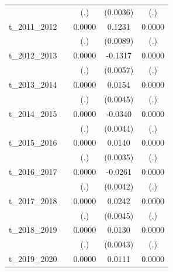 \begin{table}[htbp]
\begin{tabular}{l*{4}{c}}
            &                     &         (.)         &    (0.0036)         &         (.)         \\
[1em]
t\_2011\_2012 &                     &      0.0000         &      0.1231\sym{***}&      0.0000         \\
            &                     &         (.)         &    (0.0089)         &         (.)         \\
[1em]
t\_2012\_2013 &                     &      0.0000         &     -0.1317\sym{***}&      0.0000         \\
            &                     &         (.)         &    (0.0057)         &         (.)         \\
[1em]
t\_2013\_2014 &                     &      0.0000         &      0.0154\sym{***}&      0.0000         \\
            &                     &         (.)         &    (0.0045)         &         (.)         \\
[1em]
t\_2014\_2015 &                     &      0.0000         &     -0.0340\sym{***}&      0.0000         \\
            &                     &         (.)         &    (0.0044)         &         (.)         \\
[1em]
t\_2015\_2016 &                     &      0.0000         &      0.0140\sym{***}&      0.0000         \\
            &                     &         (.)         &    (0.0035)         &         (.)         \\
[1em]
t\_2016\_2017 &                     &      0.0000         &     -0.0261\sym{***}&      0.0000         \\
            &                     &         (.)         &    (0.0042)         &         (.)         \\
[1em]
t\_2017\_2018 &                     &      0.0000         &      0.0242\sym{***}&      0.0000         \\
            &                     &         (.)         &    (0.0045)         &         (.)         \\
[1em]
t\_2018\_2019 &                     &      0.0000         &      0.0130\sym{***}&      0.0000         \\
            &                     &         (.)         &    (0.0043)         &         (.)         \\
[1em]
t\_2019\_2020 &                     &      0.0000         &      0.0111         &      0.0000         \\

\end{tabular}
\end{table}
